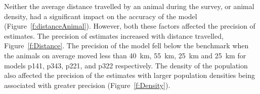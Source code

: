 \documentclass[a4paper,10pt,reqno,oneside]{amsart}
\begin{document}
\begin{figure}

\end{figure}


Neither the average distance travelled by an animal during the survey, or animal density, had a significant impact on the accuracy of the model (Figure~\ref{f:distanceAnimal}). However, both these factors affected the precision of estimates. The precision of estimates increased with distance travelled, Figure~\ref{f:Distance}. The precision of the model fell below the benchmark when the animals on average moved less than \SI{40}{\kilo\meter}, \SI{55}{\kilo\meter}, \SI{25}{\kilo\meter} and \SI{25}{\kilo\meter} for models p141, p343, p221, and p322 respectively. The density of the population also affected the precision of the estimates with larger population densities being associated with greater precision (Figure~\ref{f:Density}). 
\end{document}
